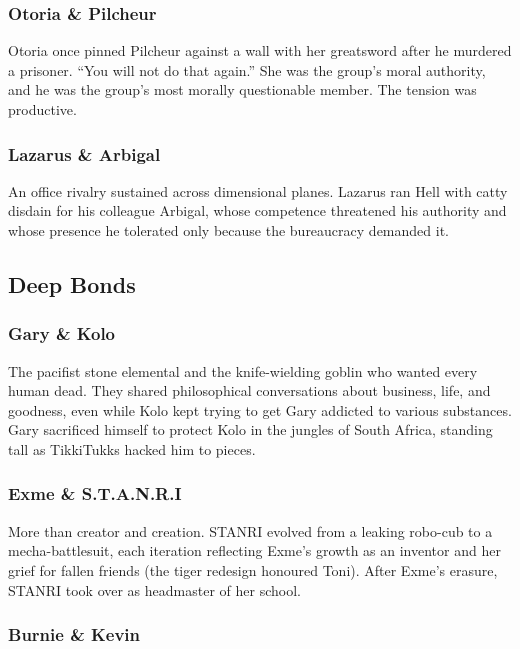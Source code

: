 \subsubsection*{Otoria \& Pilcheur}

Otoria once pinned Pilcheur against a wall with her greatsword after he murdered a prisoner.  ``You will not do that again.''  She was the group's moral authority, and he was the group's most morally questionable member.  The tension was productive.

\subsubsection*{Lazarus \& Arbigal}

An office rivalry sustained across dimensional planes.  Lazarus ran Hell with catty disdain for his colleague Arbigal, whose competence threatened his authority and whose presence he tolerated only because the bureaucracy demanded it.

\subsection*{Deep Bonds}

\subsubsection*{Gary \& Kolo}

The pacifist stone elemental and the knife-wielding goblin who wanted every human dead.  They shared philosophical conversations about business, life, and goodness, even while Kolo kept trying to get Gary addicted to various substances.  Gary sacrificed himself to protect Kolo in the jungles of South Africa, standing tall as TikkiTukks hacked him to pieces.

\subsubsection*{Exme \& S.T.A.N.R.I}

More than creator and creation.  STANRI evolved from a leaking robo-cub to a mecha-battlesuit, each iteration reflecting Exme's growth as an inventor and her grief for fallen friends (the tiger redesign honoured Toni).  After Exme's erasure, STANRI took over as headmaster of her school.

\subsubsection*{Burnie \& Kevin}

